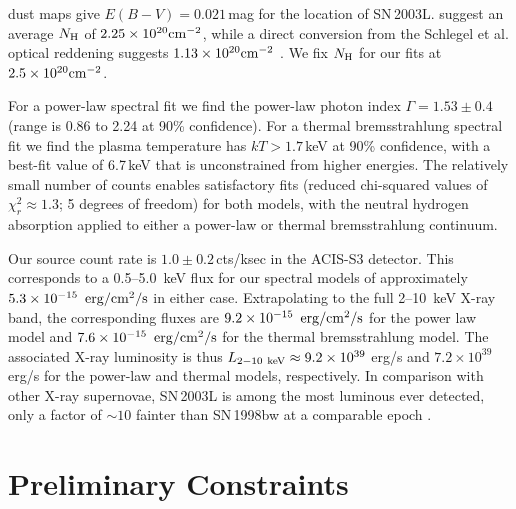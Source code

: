 \documentclass[12pt,preprint]{aastex}
\begin{document}
\citet{sfd+98} dust maps give $E(B-V)=0.021$\,mag for the location
of SN\,2003L.  \citet{dl90} suggest an average $N_{\rm H}$ of
$2.25\times 10^{20}\rm cm^{-2}$, while a direct conversion from the
Schlegel et al. optical reddening suggests $1.13\times
10^{20}\rm cm^{-2}$ \citep{ps95}. We fix $N_{\rm H}$ for our fits
at $2.5\times 10^{20}\rm cm^{-2}$.  

For a power-law spectral fit we find the power-law photon index
$\Gamma=1.53\pm 0.4$ (range is 0.86 to 2.24 at 90\% confidence).  For a
thermal bremsstrahlung spectral fit we find the plasma temperature has
$kT>1.7$\,keV at 90\% confidence, with a best-fit value of 6.7\,keV
that is unconstrained from higher energies.  The relatively small number of
counts enables satisfactory fits (reduced chi-squared values of
$\chi^2_r\approx 1.3$; 5 degrees of freedom) for both models,
with the neutral hydrogen absorption applied to either a power-law or
thermal bremsstrahlung continuum.

Our source count rate is $1.0\pm 0.2$\,cts/ksec in the ACIS-S3
detector.  This corresponds to a 0.5--5.0~keV flux for our spectral
models of approximately $5.3\times 10^{-15}\,~\rm erg/cm^2/s$ in
either case.  Extrapolating to the full 2--10~keV X-ray band, the
corresponding fluxes are $9.2\times 10^{-15}\,\rm~erg/cm^2/s$ for the
power law model and $7.6\times 10^{-15}\,\rm~erg/cm^2/s$ for the
thermal bremsstrahlung model.  The associated X-ray luminosity is thus
$L_{2-10~\rm keV}\approx 9.2\times 10^{39}$ erg/s and $7.2\times
10^{39}$ erg/s for the power-law and thermal models, respectively.  In
comparison with other X-ray supernovae, SN\,2003L is among the most
luminous ever detected, only a factor of $\sim 10$ fainter than
SN\,1998bw at a comparable epoch \citep{paa+00}.

\section{Preliminary Constraints}
\label{sec:ep}
\end{document}

